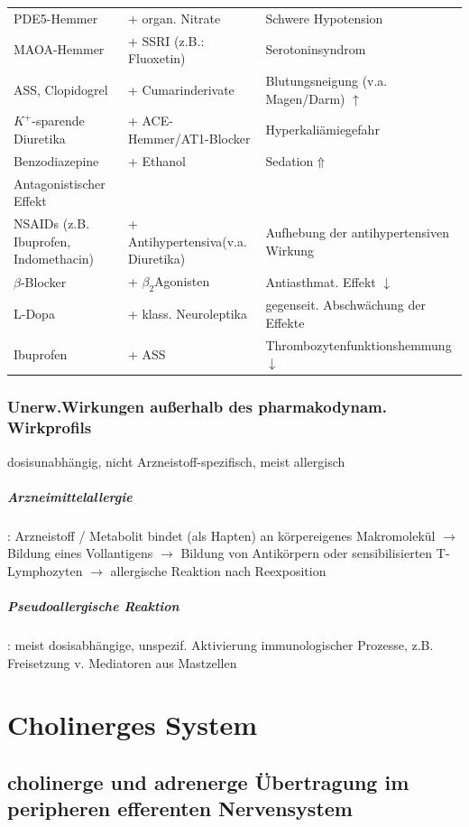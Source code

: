 \documentclass[10pt,a4paper]{report}
\begin{document}
\begin{tabularx}{\textwidth}{XXX}
PDE5-Hemmer&+ organ. Nitrate&Schwere Hypotension\\
MAOA-Hemmer&+ SSRI (z.B.: Fluoxetin)&Serotoninsyndrom\\
ASS, Clopidogrel&+ Cumarinderivate&Blutungsneigung (v.a. Magen/Darm) $\uparrow$\\
$K^+$-sparende Diuretika&+ ACE-Hemmer/AT1-Blocker&Hyperkaliämiegefahr\\
Benzodiazepine&+ Ethanol&Sedation$\Uparrow$\\
Antagonistischer Effekt&&\\
NSAIDs (z.B. Ibuprofen, Indomethacin)&+ Antihypertensiva(v.a. Diuretika)&Aufhebung der antihypertensiven Wirkung\\
$\beta$-Blocker&+ $\beta_2$Agonisten&Antiasthmat. Effekt $\downarrow$\\
L-Dopa&+ klass. Neuroleptika&gegenseit. Abschwächung der Effekte\\
Ibuprofen&+ ASS&Thrombozytenfunktionshemmung $\downarrow$\\
\end{tabularx}
\subsection{Unerw.Wirkungen außerhalb des pharmakodynam. Wirkprofils}
dosisunabhängig, nicht Arzneistoff-spezifisch, meist allergisch\\
\paragraph{Arzneimittelallergie}: Arzneistoff / Metabolit bindet (als Hapten) an körpereigenes Makromolekül $\rightarrow$ Bildung eines Vollantigens $\rightarrow$ Bildung von Antikörpern oder sensibilisierten T-Lymphozyten $\rightarrow$ allergische Reaktion nach Reexposition
\paragraph{Pseudoallergische Reaktion}: meist dosisabhängige, unspezif. Aktivierung immunologischer Prozesse, z.B. Freisetzung v. Mediatoren aus Mastzellen 
\chapter{Cholinerges System}
\section{cholinerge und adrenerge Übertragung im peripheren efferenten Nervensystem}
\end{document}
